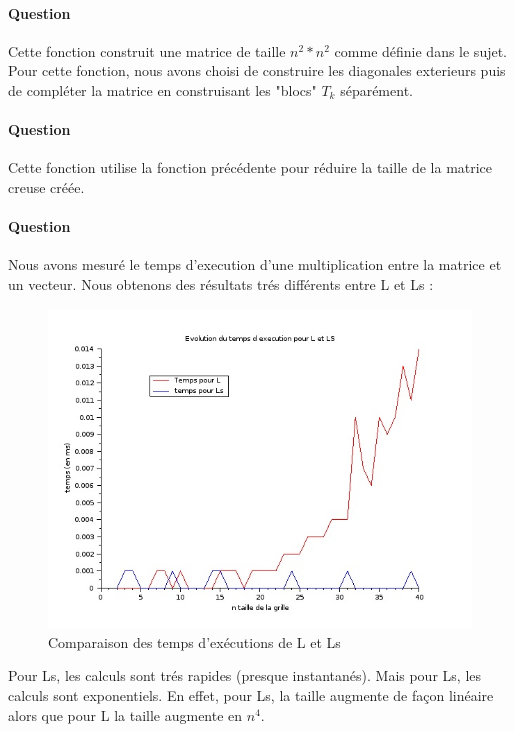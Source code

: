 \documentclass[11pt]{article}
\newcounter{question_num}
\begin{document}
	\paragraph{Question  \\}
	Cette fonction construit une matrice de taille $n^2*n^2$ comme définie dans le sujet. Pour cette fonction, nous avons choisi de construire les diagonales exterieurs puis de compléter la matrice en construisant les "blocs" $T_{k}$ séparément.
	
	\paragraph{Question  \\}
	Cette fonction utilise la fonction précédente pour réduire la taille de la matrice creuse créée.
	
	\paragraph{Question  \\}
	 Nous avons mesuré le temps d'execution d'une multiplication entre la matrice et un vecteur. Nous obtenons des résultats trés différents entre L et Ls :
	\begin{figure}[H]
	\begin{center}
		\includegraphics[width=8 cm]{Comparaison_L_Ls.jpeg}
		\caption{ Comparaison des temps d'exécutions de L et Ls}
	\end{center}
	\end{figure}
	
	Pour Ls, les calculs sont trés rapides (presque instantanés). Mais pour Ls, les calculs sont exponentiels. En effet, pour Ls, la taille augmente de façon linéaire alors que pour L la taille augmente en $n^{4}$.
	
\end{document}
